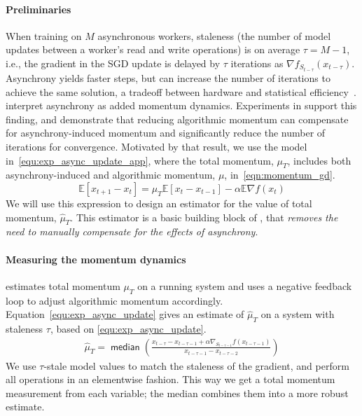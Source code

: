 \paragraph{Preliminaries}
When training on $M$ asynchronous workers, staleness (the number of model updates between a worker's read and write operations) is on average $\tau=M-1$,
i.e., the gradient in the SGD update is delayed by $\tau$ iterations as $\nabla f_{S_{t - \tau}}(x_{t - \tau} )$.
Asynchrony yields faster steps, but can
increase the number of iterations to achieve the same solution,
a tradeoff between hardware and statistical 
efficiency~\citep{DBLP:journals/pvldb/ZhangR14}.
\citet{mitliagkas2016asynchrony} interpret asynchrony as added momentum dynamics.
Experiments in \citet{hadjis2016omnivore} support this finding, and demonstrate that reducing algorithmic momentum can compensate for asynchrony-induced momentum
and significantly reduce the number of iterations for convergence.
Motivated by that result, we use the model
in~\eqref{equ:exp_async_update_app}, where the total momentum, $\mu_T$, includes both asynchrony-induced and algorithmic  momentum, $\mu$, in~\eqref{eqn:momentum_gd}.
\begin{equation}
	\mathbb{E}[ x_{t+1} - x_t ] 
	= \mu_T \mathbb{E}[x_t - x_{t-1}] - \alpha \mathbb{E}\nabla f(x_{t})
\label{equ:exp_async_update_app}
\end{equation}
We will use this expression to design an estimator for the value of total momentum, $\hat{\mu}_T$.
This estimator is a basic building block of \asynctuner, that {\em removes the need to manually compensate for the effects of asynchrony}.



\paragraph{Measuring the momentum dynamics}
\Asynctuner estimates total momentum $\mu_{T}$ on a running system and uses a negative feedback loop to adjust algorithmic momentum accordingly.
Equation~\eqref{equ:exp_async_update} gives an estimate of $\hat{\mu}_T$ on a system with staleness $\tau$, based on \eqref{equ:exp_async_update}.
\begin{align}
\hat{\mu}_T
					= \mathop{\mathsf{median}}\left(
							\frac{x_{t - \tau} - x_{t - \tau-1} + \alpha \nabla_{S_{t-\tau -1}} f(x_{t - \tau - 1} )}
							{x_{t - \tau-1} - x_{t - \tau-2}}
					\right)
\label{eqn:momentum_measurement}
\end{align}
We use $\tau$-stale model values to match the staleness of the gradient,  and perform all operations in an elementwise fashion. 
This way we get a total momentum measurement from each variable; 
the median combines them into a more robust estimate.

